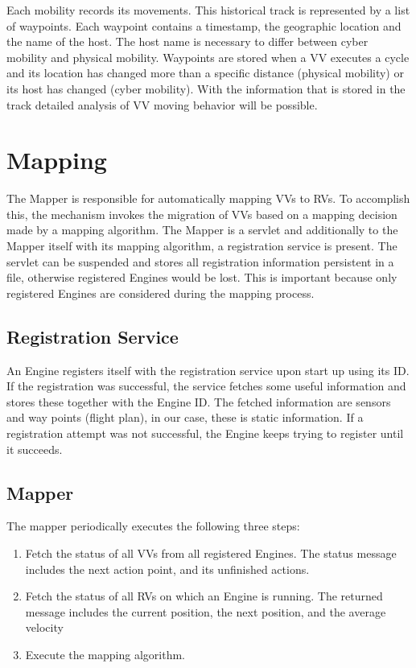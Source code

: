 Each \ac{mobility} records its movements. This historical track is represented by a list of waypoints. Each waypoint
contains a timestamp, the geographic location and the name of the host. The host name is necessary to differ between
cyber mobility and physical mobility. Waypoints are stored when a \ac{VV} executes a cycle and its location has
changed more than a specific distance (physical mobility) or its host has changed (cyber mobility). With the information
that is stored in the track detailed analysis of \ac{VV} moving behavior will be possible.



\section{Mapping}
The Mapper is responsible for automatically mapping \acp{VV} to \acp{RV}. To accomplish this, the mechanism invokes 
the migration of \acp{VV} based on a mapping decision made by a mapping algorithm. The Mapper is a servlet and
additionally to the Mapper itself with its mapping algorithm, a registration service is present. The servlet can be suspended and stores all
registration information persistent in a file, otherwise registered Engines would be lost. This is important because only registered 
Engines are considered during the mapping process.

\subsection{Registration Service}
An Engine registers itself with the registration service upon start up using its ID. If the registration was successful, the service
fetches some useful information and stores these together with the Engine ID. The fetched information are sensors and 
way points (flight plan), in our case, these is static information. If a registration attempt was not successful, the
Engine keeps trying to register until it succeeds.

\subsection{Mapper}
The mapper periodically executes the following three steps: 

\begin{enumerate}
  \item Fetch the status of all \acp{VV} from all registered Engines.
  The status message includes the next action point, and its unfinished actions.
  
  \item Fetch the status of all \acp{RV} on which an Engine is running.
  The returned message includes the current position, the next position, and the average velocity
  
  \item Execute the mapping algorithm.
\end{enumerate}

